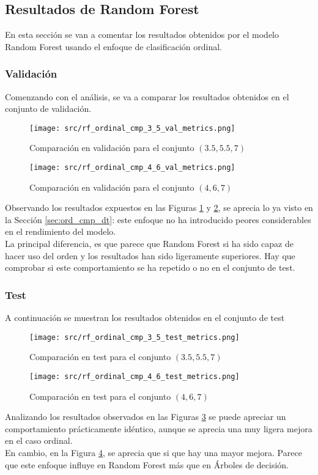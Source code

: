 \subsection{Resultados de Random Forest}
\label{sec:ord_cmp_rf}
En esta sección se van a comentar los resultados obtenidos por el modelo Random Forest usando el enfoque de clasificación ordinal.
\subsubsection*{Validación}
Comenzando con el análisis, se va a comparar los resultados obtenidos en el conjunto de validación.
\begin{figure}[H]
	\centering
	\texttt{[image: src/rf\_ordinal\_cmp\_3\_5\_val\_metrics.png]}
	\caption{Comparación en validación para el conjunto  $(3.5,5.5,7)$ }
	\label{fig:rf_ordin_val_cmp_1}
\end{figure}
\begin{figure}[H]
	\centering
	\texttt{[image: src/rf\_ordinal\_cmp\_4\_6\_val\_metrics.png]}
	\caption{Comparación en validación para el conjunto $(4,6,7)$}
	\label{fig:rf_ordin_val_cmp_2}
\end{figure}
Observando los resultados expuestos en las Figuras \ref{fig:rf_ordin_val_cmp_1} y \ref{fig:rf_ordin_val_cmp_2}, se aprecia lo ya visto en la Sección \ref{sec:ord_cmp_dt}: este enfoque no ha introducido peores considerables en el rendimiento del modelo.\\
\linebreak
La principal diferencia, es que parece que Random Forest si ha sido capaz de hacer uso del orden y los resultados han sido ligeramente superiores. Hay que comprobar si este comportamiento se ha repetido o no en el conjunto de test.
\subsubsection*{Test}
A continuación se muestran los resultados obtenidos en el conjunto de test
\begin{figure}[H]
	\centering
	\texttt{[image: src/rf\_ordinal\_cmp\_3\_5\_test\_metrics.png]}
	\caption{Comparación en test para el conjunto  $(3.5,5.5,7)$}
	\label{fig:rf_ordin_test_cmp_1}
\end{figure}
\begin{figure}[H]
	\centering
	\texttt{[image: src/rf\_ordinal\_cmp\_4\_6\_test\_metrics.png]}
	\caption{Comparación en test para el conjunto  $(4,6,7)$}
	\label{fig:rf_ordin_test_cmp_2}
\end{figure}
Analizando los resultados observados en las Figuras \ref{fig:rf_ordin_test_cmp_1} se puede apreciar un comportamiento prácticamente idéntico, aunque se aprecia una muy ligera mejora en el caso ordinal.\\
En cambio, en la Figura \ref{fig:rf_ordin_test_cmp_2}, se aprecia que si que hay una mayor mejora. Parece que este enfoque influye en Random Forest más que en Árboles de decisión.
\clearpage
